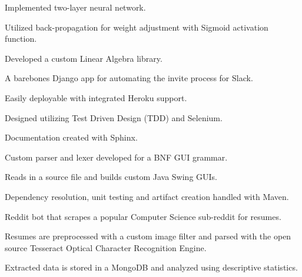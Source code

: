 \documentclass[]{sanchagrins-resume}
\begin{document}
\begin{minipage}[t]{0.63\textwidth}
\begin{tightemize}
\item Implemented two-layer neural network.
\item Utilized back-propagation for weight adjustment with Sigmoid activation function.
\item Developed a custom Linear Algebra library.
\end{tightemize}
\sectionsep

\begin{tightemize}
\item A barebones Django app for automating the invite process for Slack.
\item Easily deployable with integrated Heroku support.
\item Designed utilizing Test Driven Design (TDD) and Selenium.
\item Documentation created with Sphinx.
\end{tightemize}
\sectionsep

\begin{tightemize}
\item Custom parser and lexer developed for a BNF GUI grammar.
\item Reads in a source file and builds custom Java Swing GUIs.
\item Dependency resolution, unit testing and artifact creation handled with Maven.
\end{tightemize}
\sectionsep


\begin{tightemize}
\item Reddit bot that scrapes a popular Computer Science sub-reddit for resumes.
\item Resumes are preprocessed with a custom image filter and parsed with the open source Tesseract Optical Character Recognition Engine.
\item Extracted data is stored in a MongoDB and analyzed using descriptive statistics.
\end{tightemize}
\sectionsep


\end{minipage} 
\end{document}
